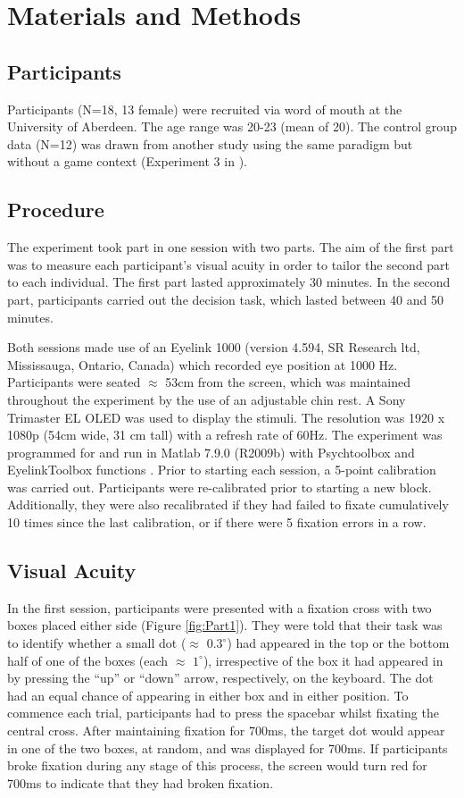 \documentclass[vision,article,submit,moreauthors,pdftex,10pt,a4paper]{mdpi}
\begin{document}
\section{Materials and Methods}
\subsection{Participants}
Participants (N=18, 13 female) were recruited via word of mouth at the University of Aberdeen. The age range was 20-23 (mean of 20). The control group data (N=12) was drawn from another study using the same paradigm but without a game context (Experiment 3 in  \cite{Huntlearning}). 

\subsection{Procedure}
The experiment took part in one session with two parts. The aim of the first part was to measure each participant’s visual acuity in order to tailor the second part to each individual. The first part lasted approximately 30 minutes. In the second part, participants carried out the decision task, which lasted between 40 and 50 minutes.

Both sessions made use of an Eyelink 1000 (version 4.594, SR Research ltd, Mississauga, Ontario, Canada) which recorded eye position at 1000 Hz. Participants were seated $\approx$ 53cm from the screen, which was maintained throughout the experiment by the use of an adjustable chin rest. A Sony Trimaster EL OLED was used to display the stimuli. The resolution was 1920 x 1080p (54cm wide, 31 cm tall) with a refresh rate of 60Hz. The experiment was programmed for and run in Matlab 7.9.0 (R2009b) with Psychtoolbox %
\cite{pelli1997videotoolbox} and EyelinkToolbox functions \cite{cornelissen2002eyelink}. Prior to starting each session, a 5-point calibration was carried out. Participants were re-calibrated prior to starting a new block. Additionally, they were also recalibrated if they had failed to fixate cumulatively 10 times since the last calibration, or if there were 5 fixation errors in a row.

\subsection{Visual Acuity}
In the first session, participants were presented with a fixation cross with two boxes placed either side (Figure \ref{fig:Part1}). They were told that their task was to identify whether a small dot ($\approx$ $0.3^{\circ}$) had appeared in the top or the bottom half of one of the boxes (each $\approx$ $1^{\circ}$), irrespective of the box it had appeared in by pressing the “up” or “down” arrow, respectively, on the keyboard. The dot had an equal chance of appearing in either box and in either position. To commence each trial, participants had to press the spacebar whilst fixating the central cross. After maintaining fixation for 700ms, the target dot would appear in one of the two boxes, at random, and was displayed for 700ms. If participants broke fixation during any stage of this process, the screen would turn red for 700ms to indicate that they had broken fixation.
\end{document}

